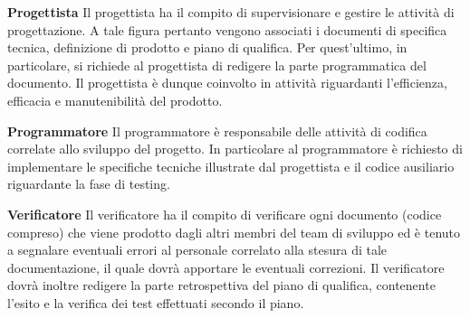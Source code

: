 \textbf{Progettista}
Il progettista ha il compito di supervisionare e gestire le attività di progettazione. A tale figura pertanto vengono associati i documenti di specifica tecnica, definizione di prodotto e piano di qualifica. Per quest'ultimo, in particolare, si richiede al progettista di redigere la parte programmatica del documento. Il progettista è dunque coinvolto in attività riguardanti l'efficienza, efficacia e manutenibilità del prodotto. 

\textbf{Programmatore}
Il programmatore è responsabile delle attività di codifica correlate allo sviluppo del progetto. In particolare al programmatore è richiesto di implementare le specifiche tecniche illustrate dal progettista e il codice ausiliario riguardante la fase di testing.

\textbf{Verificatore}
Il verificatore ha il compito di verificare ogni documento (codice compreso) che viene prodotto dagli altri membri del team di sviluppo ed è tenuto a segnalare eventuali errori al personale correlato alla stesura di tale documentazione, il quale dovrà apportare le eventuali correzioni. Il verificatore dovrà inoltre redigere la parte retrospettiva del piano di qualifica, contenente l'esito e la verifica dei test effettuati secondo il piano. 
